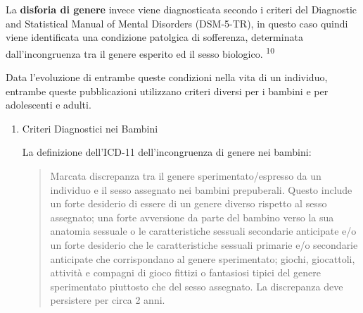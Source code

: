 \documentclass[11pt]{article}
\makeatletter
\newcommand{\cslcitation}[2]
 {\protect\hyper@linkstart{cite}{citeproc_bib_item_#1}#2\hyper@linkend}
\makeatother
\begin{document}
La \textbf{disforia di genere} invece viene diagnosticata secondo i criteri del Diagnostic and Statistical Manual of Mental Disorders (DSM-5-TR), in questo caso quindi viene identificata una condizione patolgica di sofferenza, determinata dall'incongruenza tra il genere esperito ed il sesso biologico. \textsuperscript{\cslcitation{10}{10}}

Data l'evoluzione di entrambe queste condizioni nella vita di un individuo, entrambe queste pubblicazioni utilizzano criteri diversi per i bambini e per adolescenti e adulti.
\begin{enumerate}
\item Criteri Diagnostici nei Bambini
\label{sec:org0ecac31}

La definizione dell'ICD-11 dell'incongruenza di genere nei bambini:

\begin{quote}
Marcata discrepanza tra il  genere sperimentato/espresso da un individuo e il sesso assegnato nei bambini prepuberali.  Questo include un forte desiderio di essere di un genere diverso rispetto al sesso assegnato; una  forte avversione da parte del bambino verso la sua anatomia sessuale o le caratteristiche sessuali  secondarie anticipate e/o un forte desiderio che le caratteristiche sessuali primarie e/o secondarie  anticipate che corrispondano al genere sperimentato; giochi, giocattoli, attività e compagni di  gioco fittizi o fantasiosi tipici del genere sperimentato piuttosto che del sesso assegnato. La discrepanza deve persistere per circa 2 anni.
\end{quote}



\end{enumerate}
\end{document}
